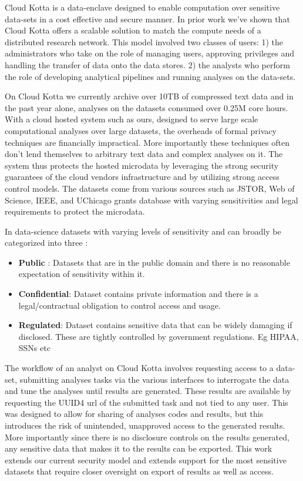 Cloud Kotta is a data-enclave designed to enable computation over sensitive data-sets
in a cost effective and secure manner. In prior work we've shown that Cloud Kotta offers
a scalable solution to match the compute needs of a distributed research network.
This model involved two classes of users: 1) the administrators who take on the role of managing
users, approving privileges and handling the transfer of data onto the data stores. 2) the analysts
who perform the role of developing analytical pipelines and running analyses on the data-sets.

On Cloud Kotta we currently archive over 10TB of compressed text data and in the past year
alone, analyses on the datasets consumed over 0.25M core hours. With a cloud hosted system
such as ours, designed to serve large scale computational analyses over large datasets,
the overheads of formal privacy techniques are financially impractical. More importantly
these techniques often don't lend themselves to arbitrary text data and complex analyses
on it. The system thus protects the hosted microdata by leveraging the strong security
guarantees of the cloud vendors infrastructure and by utilizing strong access control
models. The datasets come from various sources such as JSTOR, Web of Science, IEEE,
and UChicago grants database with varying sensitivities and legal requirements to
protect the microdata.

In data-science datasets with varying levels of sensitivity and can broadly be
categorized into three \cite{ist_dataclass} :
\begin{itemize}
\item \textbf{Public} : Datasets that are in the public domain and there is no
  reasonable expectation of sensitivity within it.
\item \textbf{Confidential}: Dataset contains private information and there is a legal/contractual obligation to control access and usage.
\item \textbf {Regulated}: Dataset contains sensitive data that can be widely damaging if disclosed.
  These are tightly controlled by government regulations. Eg HIPAA, SSNs etc
\end{itemize}

The workflow of an analyst on Cloud Kotta involves requesting access to a data-set, submitting analyses
tasks via the various interfaces to interrogate the data and tune the analyses until results are generated.
These results are available by requesting the UUID4 url of the submitted task and not tied to any user.
This was designed to allow for sharing of analyses codes and results, but this introduces the risk
of unintended, unapproved access to the generated results. More importantly since there is no disclosure
controls on the results generated, any sensitive data that makes it to the results can be exported.
This work extends our current security model and extends support for the most sensitive datasets
that require closer oversight on export of results as well as access.



